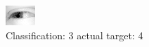 \begin{figure}[h!]
\begin{center}
\includegraphics[width=0.60\columnwidth]{figures/ID2535_class_3_target_4.png}
\end{center}
\caption{ Classification: 3 actual target: 4}
\label{fig:ID2535_class_3_target_4}
\end{figure}
